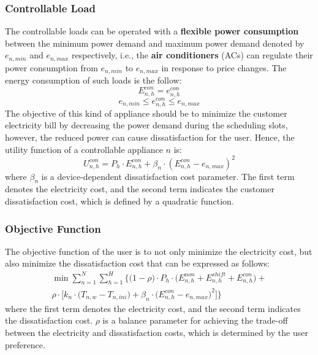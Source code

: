 \subsubsection{Controllable Load}
The controllable loads can be operated with a \textbf{flexible power consumption} between the minimum power demand and maximum power demand denoted by $e_{n,min}$ and $e_{n,max}$ respectively, i.e., the \textbf{air conditioners} (ACs) can regulate their power consumption from $e_{n,min}$ to $e_{n,max}$ in response to price changes. The energy consumption of such loads is the follow:
\begin{equation}
    E^{con}_{n,h} = e^{con}_{n,h}
\end{equation}
\begin{equation}
    e_{n,min} \leq e^{con}_{n,h} \leq e_{n,max}
\end{equation}
The objective of this kind of appliance should be to minimize the customer electricity bill by decreasing the power demand during the scheduling slots, however, the reduced power can cause dissatisfaction for the user. Hence, the utility function of a controllable appliance $n$ is:
\begin{equation}
    U^{con}_{n,h} = P_h \cdot E^{con}_{n,h} + \beta_n \cdot (E^{con}_{n,h} - e_{n,max})^2
\end{equation}
where $\beta_n$ is a device-dependent dissatisfaction cost parameter. The first term denotes the electricity cost, and the second term indicates the customer dissatisfaction cost, which is defined by a quadratic function.

\subsubsection{Objective Function}
The objective function of the user is to not only minimize the electricity cost, but also minimize the dissatisfaction cost that can be expressed as follows:
\begin{equation}
    \begin{split}
    \min \sum^{N}_{n=1} \sum^{H}_{h=1} \Bigg\{ \Big(1-\rho\Big) \cdot P_h \cdot \Big( E^{non}_{n,h} + E^{shift}_{n,h} + E^{con}_{n,h} \Big) + \\ \rho \cdot \bigg[ k_n \cdot \Big(T_{n,w} - T_{n,ini}\Big) + \beta_n \cdot \Big(E^{con}_{n,h} - e_{n,max}\Big)^2\bigg] \Bigg\}
    \end{split}
\end{equation}
where the first term denotes the electricity cost, and the second term indicates the dissatisfaction cost. $\rho$ is a balance parameter for achieving the trade-off between the electricity and dissatisfaction costs, which is determined by the user preference.

